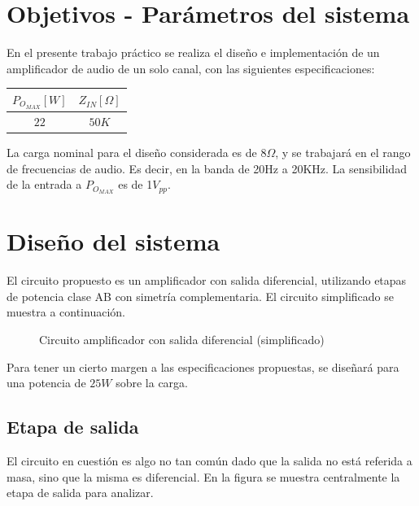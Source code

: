 



\tableofcontents
\newpage

\section{Objetivos - Parámetros del sistema}

En el presente trabajo práctico se realiza el diseño e implementación de un amplificador de audio de un solo canal, con las siguientes especificaciones:

\begin{center}
\begin{tabular}{|c|c|}
\hline 
$P_{O_{MAX}}[W]$ & $Z_{IN}[\Omega]$\\
\hline 
\hline 
$22$ & $50K$\\
\hline 
\end{tabular}
\end{center}

La carga nominal para el diseño considerada es de $8\Omega$, y se trabajará en el rango de frecuencias de audio. Es decir, en la banda de 20Hz a 20KHz. La sensibilidad de la entrada a $P_{O_{MAX}}$ es de 1$V_{pp}$.

\section{Diseño del sistema}

El circuito propuesto es un amplificador con salida diferencial, utilizando etapas de potencia clase AB con simetría complementaria. El circuito simplificado se muestra a continuación.

\begin{figure}[!ht]
\begin{centering}
\par\end{centering}
\caption{Circuito amplificador con salida diferencial (simplificado)}
\end{figure}

Para tener un cierto margen a las especificaciones propuestas, se diseñará para una potencia de $25W$ sobre la carga.

\subsection{Etapa de salida}

El circuito en cuestión es algo no tan común dado que la salida no está referida a masa, sino que la misma es diferencial. En la figura se muestra centralmente la etapa de salida para analizar.

